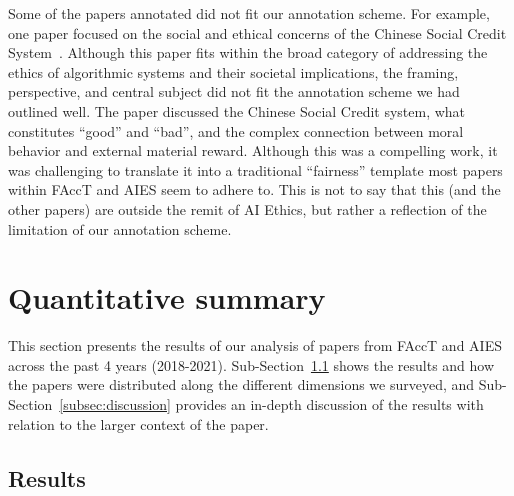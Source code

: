 \documentclass[manuscript]{acmart}
\begin{document}
Some of the papers annotated did not fit our annotation scheme. For example, one paper focused on the social and ethical concerns of the Chinese Social Credit System~\cite{engelmann2019clear}. Although this paper fits within the broad category of addressing the ethics of algorithmic systems and their societal implications, the framing, perspective, and central subject did not fit the annotation scheme we had outlined well. The paper discussed the Chinese Social Credit system, what constitutes ``good'' and ``bad'', and the complex connection between moral behavior and external material reward. %
Although this was a compelling work, it was challenging to translate it into a traditional ``fairness'' template most papers within FAccT and AIES seem to adhere to. This is not to say that this (and the other papers) are outside the remit of AI Ethics, but rather a reflection of the limitation of our annotation scheme.  

 
\section{Quantitative summary}
\label{sect:quant}
This section %
presents the results of our analysis of papers from FAccT and AIES across the past 4 years (2018-2021). Sub-Section~\ref{subsec:results} shows the results and how the papers were distributed along the different dimensions we surveyed, and Sub-Section~\ref{subsec:discussion} provides an in-depth discussion of the results with relation to the larger context of the paper.%

\subsection{Results}
\label{subsec:results}
\end{document}
